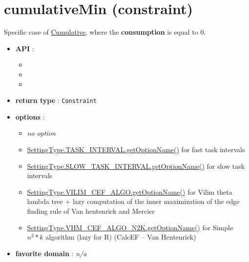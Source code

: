 \section{cumulativeMin (constraint)}\label{cumulativemin:cumulativeminconstraint}\hypertarget{cumulativemin:cumulativeminconstraint}{}
Specific case of \hyperlink{cumulative:cumulativeconstraint}{Cumulative}, where the \textbf{consumption} is equal to 0.

\begin{itemize}
	\item \textbf{API} :
	\begin{itemize}
		\item {}
		\item {}
		\item {}
	\end{itemize}
	\item \textbf{return type} : \texttt{Constraint}
	\item \textbf{options} :
	\begin{itemize}
		\item \emph{no option}
		\item \hyperlink{ccumulativeti:ccumulativetioptions}{SettingType.TASK\_INTERVAL.getOptionName()} for fast task intervals
		\item \hyperlink{ccumulativesti:ccumulativestioptions}{SettingType.SLOW\_TASK\_INTERVAL.getOptionName()} for slow task intervals
		\item \hyperlink{ccumulativecef:ccumulativecefoptions}{SettingType.VILIM\_CEF\_ALGO.getOptionName()} for Vilim theta lambda tree + lazy computation of the inner maximization of the edge finding rule of Van hentenrick and Mercier
		\item \hyperlink{ccumulativescef:ccumulativescefoptions}{SettingType.VHM\_CEF\_ALGO\_N2K.getOptionName()} for Simple $n^2 * k$ algorithm (lazy for R) (CalcEF -- Van Hentenrick)
	\end{itemize}
	\item \textbf{favorite domain} : \emph{n/a}
\end{itemize}